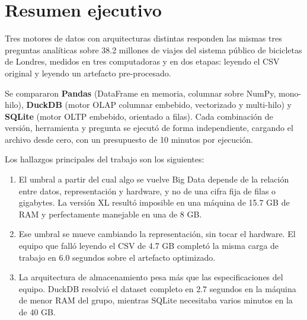 \section{Resumen ejecutivo}

Tres motores de datos con arquitecturas distintas responden las mismas tres preguntas analíticas sobre 38.2 millones de viajes del sistema público de bicicletas de Londres, medidos en tres computadoras y en dos etapas: leyendo el CSV original y leyendo un artefacto pre-procesado.

Se compararon \textbf{Pandas} (DataFrame en memoria, columnar sobre NumPy, mono-hilo), \textbf{DuckDB} (motor OLAP columnar embebido, vectorizado y multi-hilo) y \textbf{SQLite} (motor OLTP embebido, orientado a filas). Cada combinación de versión, herramienta y pregunta se ejecutó de forma independiente, cargando el archivo desde cero, con un presupuesto de 10 minutos por ejecución.

Los hallazgos principales del trabajo son los siguientes:

\begin{enumerate}
  \item El umbral a partir del cual algo se vuelve Big Data depende de la relación entre datos, representación y hardware, y no de una cifra fija de filas o gigabytes. La versión XL resultó imposible en una máquina de 15.7 GB de RAM y perfectamente manejable en una de 8 GB.
  \item Ese umbral se mueve cambiando la representación, sin tocar el hardware. El equipo que falló leyendo el CSV de 4.7 GB completó la misma carga de trabajo en 6.0 segundos sobre el artefacto optimizado.
  \item La arquitectura de almacenamiento pesa más que las especificaciones del equipo. DuckDB resolvió el dataset completo en 2.7 segundos en la máquina de menor RAM del grupo, mientras SQLite necesitaba varios minutos en la de 40 GB.
\end{enumerate}
